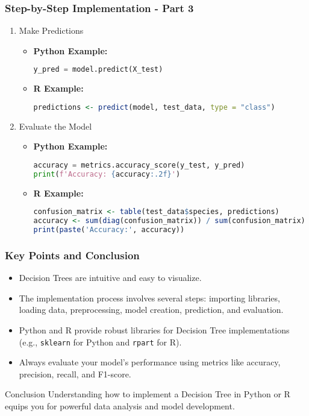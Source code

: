 \documentclass[aspectratio=169]{beamer}
\begin{document}
\begin{frame}[fragile]
    \frametitle{Step-by-Step Implementation - Part 3}
    \begin{enumerate}[resume]
        \item Make Predictions
        \begin{itemize}
            \item \textbf{Python Example:}
            \begin{lstlisting}[language=Python]
y_pred = model.predict(X_test)
            \end{lstlisting}
            \item \textbf{R Example:}
            \begin{lstlisting}[language=R]
predictions <- predict(model, test_data, type = "class")
            \end{lstlisting}
        \end{itemize}

        \item Evaluate the Model
        \begin{itemize}
            \item \textbf{Python Example:}
            \begin{lstlisting}[language=Python]
accuracy = metrics.accuracy_score(y_test, y_pred)
print(f'Accuracy: {accuracy:.2f}')
            \end{lstlisting}
            \item \textbf{R Example:}
            \begin{lstlisting}[language=R]
confusion_matrix <- table(test_data$species, predictions)
accuracy <- sum(diag(confusion_matrix)) / sum(confusion_matrix)
print(paste('Accuracy:', accuracy))
            \end{lstlisting}
        \end{itemize}
    \end{enumerate}
\end{frame}

\begin{frame}
    \frametitle{Key Points and Conclusion}
    \begin{itemize}
        \item Decision Trees are intuitive and easy to visualize.
        \item The implementation process involves several steps: importing libraries, loading data, preprocessing, model creation, prediction, and evaluation.
        \item Python and R provide robust libraries for Decision Tree implementations (e.g., \texttt{sklearn} for Python and \texttt{rpart} for R).
        \item Always evaluate your model's performance using metrics like accuracy, precision, recall, and F1-score.
    \end{itemize}
    
    \begin{block}{Conclusion}
        Understanding how to implement a Decision Tree in Python or R equips you for powerful data analysis and model development.
    \end{block}
\end{frame}
\end{document}

